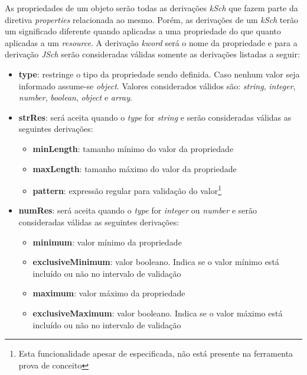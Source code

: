 \label{sec:bnf:props}
As propriedades de um objeto serão todas as derivações \textit{kSch} que fazem parte da diretiva \textit{properties} relacionada ao mesmo. Porém, as derivações de um \textit{kSch} terão um significado diferente quando aplicadas a uma propriedade do que quanto aplicadas a um \textit{resource}. A derivação \textit{kword} será o nome da propriedade e para a derivação \textit{JSch} serão consideradas válidas somente as derivações listadas a seguir:
\begin{itemize}


    \item \textbf{type}: restringe o tipo da propriedade sendo definida. Caso nenhum valor seja informado assume-se \textit{object}. Valores considerados válidos são: \textit{string}, \textit{integer}, \textit{number}, \textit{boolean}, \textit{object} e \textit{array}.

    \item \textbf{strRes}: será aceita quando o \textit{type} for \textit{string} e serão consideradas válidas as seguintes derivações:
    \begin{itemize}
        \item \textbf{minLength}: tamanho mínimo do valor da propriedade
        \item \textbf{maxLength}: tamanho máximo do valor da propriedade
        \item \textbf{pattern}: expressão regular para validação do valor\footnote{Esta funcionalidade apesar de especificada, não está presente na ferramenta prova de conceito}
    \end{itemize}

    \item \textbf{numRes}: será aceita quando o \textit{type} for \textit{integer} ou \textit{number} e serão consideradas válidas as seguintes derivações:
    \begin{itemize}
        \item \textbf{minimum}: valor mínimo da propriedade
        \item \textbf{exclusiveMinimum}: valor booleano. Indica se o valor mínimo está incluído ou não no intervalo de validação
        \item \textbf{maximum}: valor máximo da propriedade
        \item \textbf{exclusiveMaximum}: valor booleano. Indica se o valor máximo está incluído ou não no intervalo de validação
    \end{itemize}


\end{itemize}
